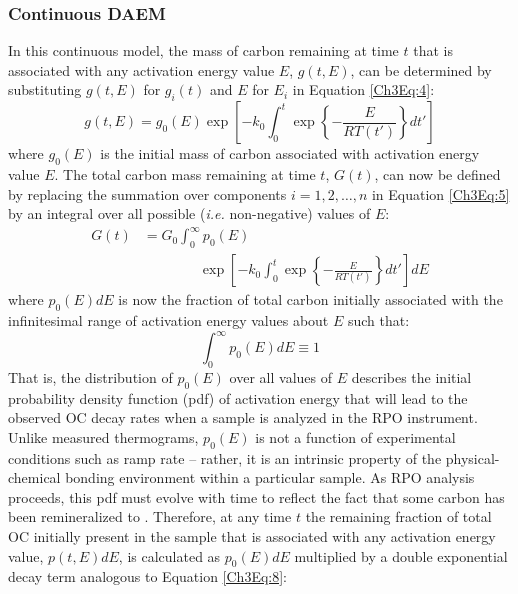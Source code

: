 \subsubsection{Continuous DAEM}

In this continuous model, the mass of carbon remaining at time $t$ that is associated with any activation energy value $E$, $g(t, E)$, can be determined by substituting $g(t,E)$ for $g_{i}(t)$ and $E$ for $E_{i}$ in Equation \ref{Ch3Eq:4}:
%
\begin{equation}\label{Ch3Eq:8}
	g(t, E) = g_{0}(E) \exp \left[ - k_{0} \int_{0}^{t} \exp \left\{ - \frac{E}{RT(t')} \right\} dt' \right]
\end{equation}
%
where $g_{0}(E)$ is the initial mass of carbon associated with activation energy value $E$. The total carbon mass remaining at time $t$, $G(t)$, can now be defined by replacing the summation over components $i = 1,2,\dots,n$ in Equation \ref{Ch3Eq:5} by an integral over all possible (\textit{i.e.} non-negative) values of $E$:
%
\begin{equation}\label{Ch3Eq:9}
	\begin{split}
	G(t) & = G_{0} \int_{0}^{\infty} p_{0}(E) \\
	& \qquad\qquad \exp \left[ - k_{0} \int_{0}^{t} \exp \left\{ - \frac{E}{RT(t')} \right\} dt' \right] dE
	\end{split}
\end{equation}
%
where $p_{0}(E) dE$ is now the fraction of total carbon initially associated with the infinitesimal range of activation energy values about $E$ such that:
%
\begin{equation}\label{Ch3Eq:10}
    \int_{0}^{\infty} p_{0}(E) dE  \equiv 1
\end{equation}
%
That is, the distribution of $p_{0}(E)$ over all values of $E$ describes the initial probability density function (pdf) of activation energy that will lead to the observed OC decay rates when a sample is analyzed in the RPO instrument. Unlike measured thermograms, $p_{0}(E)$ is not a function of experimental conditions such as ramp rate -- rather, it is an intrinsic property of the physical-chemical bonding environment within a particular sample. As RPO analysis proceeds, this pdf must evolve with time to reflect the fact that some carbon has been remineralized to . Therefore, at any time $t$ the remaining fraction of total OC initially present in the sample that is associated with any activation energy value, $p(t, E) dE$, is calculated as $p_{0}(E)dE$ multiplied by a double exponential decay term analogous to Equation \ref{Ch3Eq:8}:
